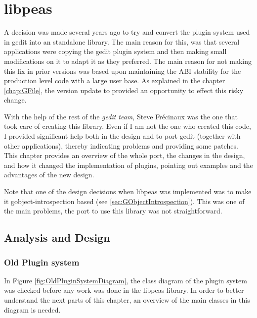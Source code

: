 
\chapter{libpeas}\label{chap:libpeas}

A decision was made several years ago to try and convert the plugin system used in gedit into an standalone library. The main reason for this, was that several applications were copying the gedit plugin system and then making small modifications on it to adapt it as they preferred.  The main reason for not making this fix in prior versions was based upon maintaining the ABI stability for the production level code with a large user base.
As explained in the chapter \ref{chap:GFile}, the version update to  provided an opportunity to effect this risky change.

With the help of the rest of the \emph{gedit team}, Steve Fr\'ecinaux was the one that took care of creating this library. Even if I am not the one who created this code,  I provided significant help both in the design and to port gedit (together with other applications), thereby 
indicating problems and providing some patches. This chapter provides an overview of the whole port, the changes in the design,  
and how it changed the implementation of plugins, pointing out examples and the advantages of the new design.

Note that one of the design decisions when libpeas was implemented was to make it gobject-introspection based (see \ref{sec:GObjectIntrospection}). This was one of the main problems, the port to use this library was not straightforward.

\section{Analysis and Design}

\subsection{Old Plugin system}\label{sec:OldPluginSystem}


In Figure \ref{fig:OldPluginSystemDiagram}, the class diagram of the plugin system was checked before 
any work was done in the libpeas library. In order to better understand the next parts of this chapter, an overview of the 
main classes in this diagram is needed.

